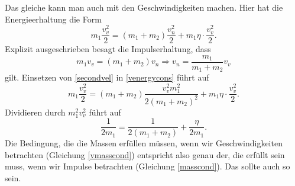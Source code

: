 \begin{Answer}[ref = ipho201741]
	Das gleiche kann man auch mit den Geschwindigkeiten machen. Hier hat die Energieerhaltung die Form
	\begin{equation}\label{venergycons}
		m_1 \frac{v_v^2}{2} = \left(m_1+m_2\right)\frac{v_n^2}{2} + m_1\eta  \cdot \frac{v_v^2}{2}.
	\end{equation}
	Explizit ausgeschrieben besagt die Impulserhaltung, dass 
	\begin{equation}\label{secondvel}
		m_1 v_v = \left(m_1+m_2\right)v_n \Rightarrow v_n = \frac{m_1}{m_1+m_2}v_v
	\end{equation}
	gilt. Einsetzen von \eqref{secondvel} in \eqref{venergycons} führt auf
	\begin{equation*}
	m_1\frac{v_v^2}{2} = \left(m_1+m_2\right)\frac{v_v^2 m_1^2}{2\left(m_1+m_2\right)^2} + m_1\eta \cdot \frac{v_v^2}{2}.
	\end{equation*}
	Dividieren durch $m_1^2v_v^2$ führt auf 
	\begin{equation}\label{vmasscond}
		\frac{1}{2m_1} = \frac{1}{2\left(m_1+m_2\right)} + \frac{\eta}{2m_1}.
	\end{equation}
	Die Bedingung, die die Massen erfüllen müssen, wenn wir Geschwindigkeiten betrachten (Gleichung \eqref{vmasscond}) entspricht also genau der, die erfüllt sein muss, wenn wir Impulse betrachten (Gleichung \eqref{masscond}). Das sollte auch so sein.
\end{Answer}
